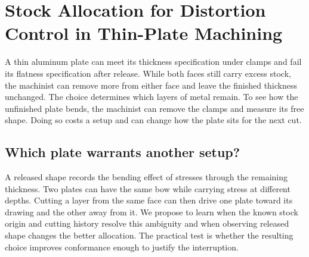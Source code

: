\documentclass[11pt,letterpaper]{article}
\begin{document}
\section*{Stock Allocation for Distortion Control in Thin-Plate Machining}

A thin aluminum plate can meet its thickness specification under clamps and fail its flatness specification after release. While both faces still carry excess stock, the machinist can remove more from either face and leave the finished thickness unchanged. The choice determines which layers of metal remain. To see how the unfinished plate bends, the machinist can remove the clamps and measure its free shape. Doing so costs a setup and can change how the plate sits for the next cut.

\subsection*{Which plate warrants another setup?}

A released shape records the bending effect of stresses through the remaining thickness. Two plates can have the same bow while carrying stress at different depths. Cutting a layer from the same face can then drive one plate toward its drawing and the other away from it. We propose to learn when the known stock origin and cutting history resolve this ambiguity and when observing released shape changes the better allocation. The practical test is whether the resulting choice improves conformance enough to justify the interruption.

\begin{center}


\end{center}
\end{document}
